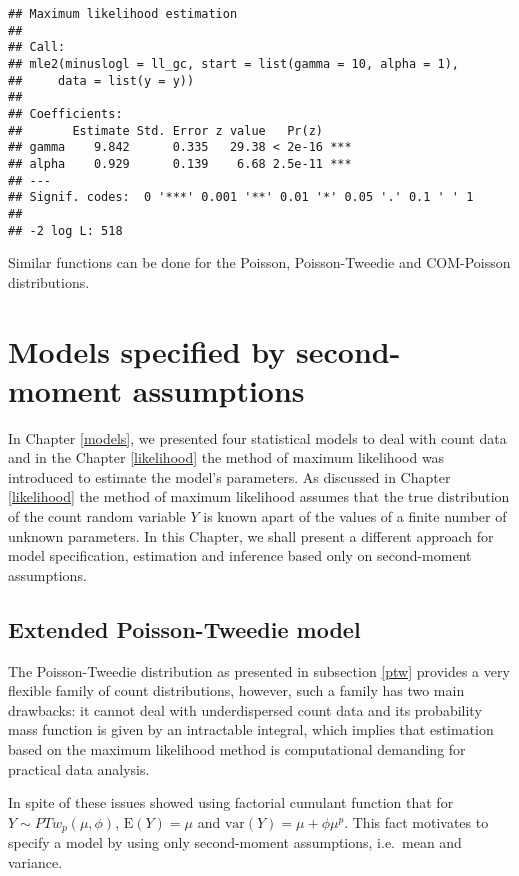 \documentclass[9pt,a5paper,]{book}
\theoremstyle{definition}
\theoremstyle{definition}
\theoremstyle{remark}
\begin{document}
\begin{verbatim}
## Maximum likelihood estimation
## 
## Call:
## mle2(minuslogl = ll_gc, start = list(gamma = 10, alpha = 1), 
##     data = list(y = y))
## 
## Coefficients:
##       Estimate Std. Error z value   Pr(z)    
## gamma    9.842      0.335   29.38 < 2e-16 ***
## alpha    0.929      0.139    6.68 2.5e-11 ***
## ---
## Signif. codes:  0 '***' 0.001 '**' 0.01 '*' 0.05 '.' 0.1 ' ' 1
## 
## -2 log L: 518
\end{verbatim}

Similar functions can be done for the Poisson, Poisson-Tweedie and
COM-Poisson distributions.

\chapter{Models specified by second-moment assumptions}\label{SM}

In Chapter \ref{models}, we presented four statistical models to deal
with count data and in the Chapter \ref{likelihood} the method of
maximum likelihood was introduced to estimate the model's parameters. As
discussed in Chapter \ref{likelihood} the method of maximum likelihood
assumes that the true distribution of the count random variable \(Y\) is
known apart of the values of a finite number of unknown parameters. In
this Chapter, we shall present a different approach for model
specification, estimation and inference based only on second-moment
assumptions.

\section{Extended Poisson-Tweedie
model}\label{extended-poisson-tweedie-model}

The Poisson-Tweedie distribution as presented in subsection \ref{ptw}
provides a very flexible family of count distributions, however, such a
family has two main drawbacks: it cannot deal with underdispersed count
data and its probability mass function is given by an intractable
integral, which implies that estimation based on the maximum likelihood
method is computational demanding for practical data analysis.

In spite of these issues \citet{Jorgensen2014} showed using factorial
cumulant function that for \(Y \sim PTw_p(\mu, \phi)\),
\(\mathrm{E}(Y) = \mu\) and \(\mathrm{var}(Y) = \mu + \phi \mu^p\). This
fact motivates \citet{Bonat2016b} to specify a model by using only
second-moment assumptions, i.e.~mean and variance.
\end{document}
